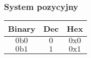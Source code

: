 \documentclass[10pt,t]{beamer}
\begin{document}

















































\begin{frame}
  \frametitle{System pozycyjny}


  \begin{center}

    \begin{tabular}{|c|c|c|}
      \hline
      Binary & Dec & Hex \\
      \hline
      $0\text{b}0$ & $0$ & $0\text{x}0$ \\
      $0\text{b}1$ & $1$ & $0\text{x}1$ \\
      \hline
    \end{tabular}

  \end{center}

\end{frame}
\end{document}
